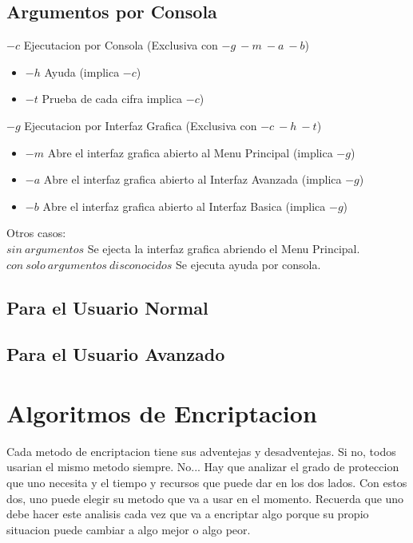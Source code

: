 \documentclass{article}
\begin{document}
		\subsection{Argumentos por Consola}
			$-c$ Ejecutacion por Consola (Exclusiva con $-g\ -m\ -a\ -b$) %
			\begin{itemize}
				\item $-h$ Ayuda (implica $-c$) %
				\item $-t$ Prueba de cada cifra implica $-c$) %
			\end{itemize}
			$-g$ Ejecutacion por Interfaz Grafica (Exclusiva con $-c\ -h\ -t$) %
			\begin{itemize}
				\item $-m$ Abre el interfaz grafica abierto al Menu Principal (implica $-g$) %
				\item $-a$ Abre el interfaz grafica abierto al Interfaz Avanzada (implica $-g$) %
				\item $-b$ Abre el interfaz grafica abierto al Interfaz Basica (implica $-g$) %
			\end{itemize}
			Otros casos: \\
			$sin\ argumentos$ Se ejecta la interfaz grafica abriendo el Menu Principal. \\
			$con\ solo\ argumentos\ disconocidos$ Se ejecuta ayuda por consola.
		\subsection{Para el Usuario Normal}
		\subsection{Para el Usuario Avanzado}
	\section{Algoritmos de Encriptacion}
		Cada metodo de encriptacion tiene sus adventejas y desadventejas. Si no, todos usarian el mismo metodo siempre. No... Hay que analizar el grado de proteccion que uno necesita y el tiempo y recursos que puede dar en los dos lados. Con estos dos, uno puede elegir su metodo que va a usar en el momento. Recuerda que uno debe hacer este analisis cada vez que va a encriptar algo porque su propio situacion puede cambiar a algo mejor o algo peor.
\end{document}
